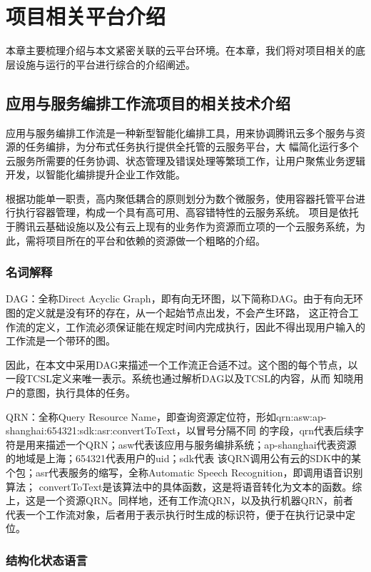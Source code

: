 
\chapter{项目相关平台介绍}
本章主要梳理介绍与本文紧密关联的云平台环境。在本章，我们将对项目相关的底层设施与运行的平台进行综合的介绍阐述。
\cite{ipacfteaom1}
\section{应用与服务编排工作流项目的相关技术介绍}
应用与服务编排工作流是一种新型智能化编排工具，用来协调腾讯云多个服务与资源的任务编排，为分布式任务执行提供全托管的云服务平台，大
幅简化运行多个云服务所需要的任务协调、状态管理及错误处理等繁琐工作，让用户聚焦业务逻辑开发，以智能化编排提升企业工作效能\cite{jydyyybp}。

根据功能单一职责，高内聚低耦合的原则划分为数个微服务，使用容器托管平台进行执行容器管理，构成一个具有高可用、高容错特性的云服务系统。
项目是依托于腾讯云基础设施以及公有云上现有的业务作为资源而立项的一个云服务系统，为此，需将项目所在的平台和依赖的资源做一个粗略的介绍。


\subsection{名词解释}

DAG：全称Direct Acyclic Graph，即有向无环图，以下简称DAG。由于有向无环图的定义就是没有环的存在，从一个起始节点出发，不会产生环路，
这正符合工作流的定义，工作流必须保证能在规定时间内完成执行，因此不得出现用户输入的工作流是一个带环的图。

因此，在本文中采用DAG来描述一个工作流正合适不过。这个图的每个节点，以一段TCSL定义来唯一表示。系统也通过解析DAG以及TCSL的内容，从而
知晓用户的意图，执行具体的任务。

QRN：全称Query Resource Name，即查询资源定位符，形如qrn:asw:ap-shanghai:654321:sdk:asr:convertToText，以冒号分隔不同
的字段，qrn代表后续字符是用来描述一个QRN；asw代表该应用与服务编排系统；ap-shanghai代表资源的地域是上海；654321代表用户的uid；sdk代表
该QRN调用公有云的SDK中的某个包；asr代表服务的缩写，全称Automatic Speech Recognition，即调用语音识别算法；
convertToText是该算法中的具体函数，这是将语音转化为文本的函数。综上，这是一个资源QRN。同样地，还有工作流QRN，以及执行机器QRN，前者
代表一个工作流对象，后者用于表示执行时生成的标识符，便于在执行记录中定位。


\subsection{结构化状态语言}

